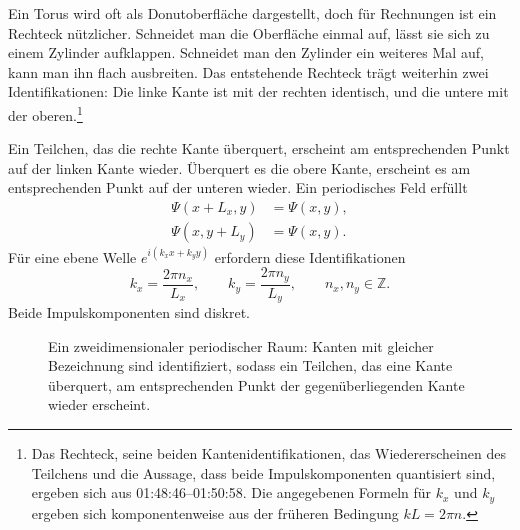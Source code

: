 Ein Torus wird oft als Donutoberfläche dargestellt, doch für Rechnungen ist ein Rechteck nützlicher. Schneidet man die Oberfläche einmal auf, lässt sie sich zu einem Zylinder aufklappen. Schneidet man den Zylinder ein weiteres Mal auf, kann man ihn flach ausbreiten. Das entstehende Rechteck trägt weiterhin zwei Identifikationen: Die linke Kante ist mit der rechten identisch, und die untere mit der oberen.\footnote{Das Rechteck, seine beiden Kantenidentifikationen, das Wiedererscheinen des Teilchens und die Aussage, dass beide Impulskomponenten quantisiert sind, ergeben sich aus 01:48:46--01:50:58. Die angegebenen Formeln für \(k_x\) und \(k_y\) ergeben sich komponentenweise aus der früheren Bedingung \(kL=2\pi n\).}

Ein Teilchen, das die rechte Kante überquert, erscheint am entsprechenden Punkt auf der linken Kante wieder. Überquert es die obere Kante, erscheint es am entsprechenden Punkt auf der unteren wieder. Ein periodisches Feld erfüllt
\begin{align}
\Psi(x+L_x,y)&=\Psi(x,y),\\
\Psi(x,y+L_y)&=\Psi(x,y).
\end{align}
Für eine ebene Welle \(e^{i(k_x x+k_y y)}\) erfordern diese Identifikationen
\begin{equation}
k_x=\frac{2\pi n_x}{L_x},
\qquad
k_y=\frac{2\pi n_y}{L_y},
\qquad
n_x,n_y\in\mathbb Z.
\end{equation}
Beide Impulskomponenten sind diskret.

\begin{figure}[t]
\centering
{}
\caption{Ein zweidimensionaler periodischer Raum: Kanten mit gleicher Bezeichnung sind identifiziert, sodass ein Teilchen, das eine Kante überquert, am entsprechenden Punkt der gegenüberliegenden Kante wieder erscheint.}
\end{figure}

